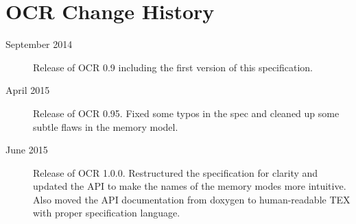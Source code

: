 %

\chapter{OCR Change  History}
\label{chap:OCR Change History}
\label{chap:Appendix D}
\begin{description}
\item[September 2014] Release of OCR 0.9 including the first version
  of this specification.
\item[April 2015] Release of OCR 0.95.  Fixed some typos in the spec and
cleaned up some subtle flaws in the memory model.
\item[June 2015] Release of OCR 1.0.0. Restructured the specification for clarity and
updated the API to make the names of the memory modes more intuitive. Also moved
the API documentation from doxygen to human-readable TEX with proper specification
language.
\end{description}

